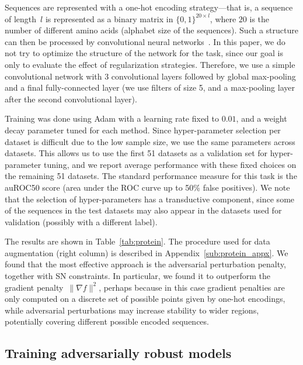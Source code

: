 Sequences are represented with a one-hot encoding strategy---that is, a
sequence of length~$l$ is represented as a binary matrix in $\{0,1\}^{20 \times
l}$, where $20$ is the number of different amino acids (alphabet size of the sequences).
Such a structure can then be processed by convolutional neural
networks~\citep{alipanahi2015predicting}.
In this paper, we do not try to optimize the structure of the network for the task,
since our goal is only to evaluate the effect of regularization strategies.
Therefore, we use a simple convolutional network with 3 convolutional layers
followed by global max-pooling and a final fully-connected layer
(we use filters of size 5, and a max-pooling layer after the second convolutional layer).

Training was done using Adam with a learning rate fixed to $0.01$, and a weight decay parameter
tuned for each method.
Since hyper-parameter selection per dataset is difficult due to the low sample size, we use the
same parameters across datasets. This allows us
to use the first 51 datasets as a validation set for hyper-parameter tuning,
and we report average performance with these fixed choices on the remaining 51 datasets.
The standard performance measure for this task is the auROC50 score (area under the ROC curve up to 50\% false positives).
We note that the selection of  hyper-parameters has a transductive component, since some of the sequences
in the test datasets may also appear in the datasets used for validation (possibly with a different label).

The results are shown in Table~\ref{tab:protein}.
The procedure used for data augmentation (right column) is described in Appendix~\ref{sub:protein_appx}.
We found that the most effective approach is the adversarial perturbation penalty,
together with SN constraints.
In particular, we found it to outperform the gradient penalty~$\|\nabla f\|^2$,
perhaps because in this case gradient penalties are only computed on a discrete set
of possible points given by one-hot encodings, while adversarial perturbations may
increase stability to wider regions, potentially covering different possible encoded
sequences.




\subsection{Training adversarially robust models}
\label{sub:exp_robust}

